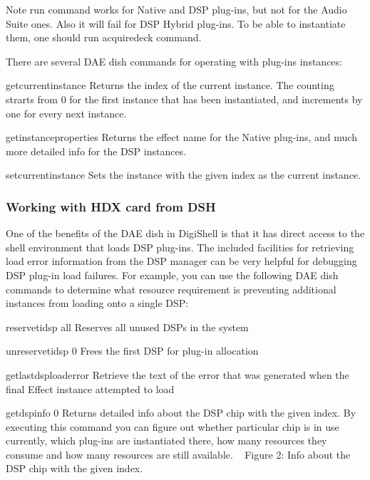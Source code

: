 \begin{DoxyNote}{Note}
{\ttfamily run} command works for Native and D\+SP plug-\/ins, but not for the Audio Suite ones. Also it will fail for D\+SP Hybrid plug-\/ins. To be able to instantiate them, one should run {\ttfamily acquiredeck} command.
\end{DoxyNote}
There are several D\+AE dish commands for operating with plug-\/ins\textquotesingle{} instances\+: 
\begin{DoxyItemize}
\item {\ttfamily getcurrentinstance} Returns the index of the current instance. The counting strarts from 0 for the first instance that has been instantiated, and increments by one for every next instance. ~\newline
  
\item {\ttfamily getinstanceproperties} Returns the effect name for the Native plug-\/ins, and much more detailed info for the D\+SP instances.  
\item {\ttfamily setcurrentinstance} Sets the instance with the given index as the current instance.  
\end{DoxyItemize}

\hypertarget{a00835_subsection__working_with_hdx_card_from_dsh}{}\subsubsection{Working with H\+D\+X card from D\+SH}\label{a00835_subsection__working_with_hdx_card_from_dsh}
 One of the benefits of the D\+AE dish in Digi\+Shell is that it has direct access to the shell environment that loads D\+SP plug-\/ins. The included facilities for retrieving load error information from the D\+SP manager can be very helpful for debugging D\+SP plug-\/in load failures. For example, you can use the following D\+AE dish commands to determine what resource requirement is preventing additional instances from loading onto a single D\+SP\+: 
\begin{DoxyEnumerate}
\item {\ttfamily reservetidsp all} Reserves all unused D\+S\+Ps in the system  
\item {\ttfamily unreservetidsp 0} Frees the first D\+SP for plug-\/in allocation  
\item {\ttfamily getlastdsploaderror} Retrieve the text of the error that was generated when the final Effect instance attempted to load  
\item {\ttfamily getdspinfo 0} Returns detailed info about the D\+SP chip with the given index. By executing this command you can figure out whether particular chip is in use currently, which plug-\/ins are instantiated there, how many resources they consume and how many resources are still available. ~\newline
   Figure 2\+: Info about the D\+SP chip with the given index.  
\end{DoxyEnumerate}

